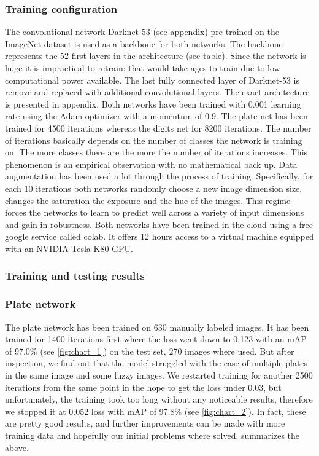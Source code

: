 \subsubsection{Training configuration}
The convolutional network Darknet-53 (see appendix) pre-trained on the ImageNet dataset is used as a backbone for both networks. The backbone
represents the 52 first layers in the architecture (see table). Since the network is huge it is impractical to retrain; that would take ages to train due to low computational power available. The last fully connected layer of Darknet-53 is remove and replaced with additional convolutional layers. The exact architecture is presented in appendix.
Both networks have been trained with 0.001 learning rate using the Adam optimizer with a momentum of 0.9. The plate net has been trained for
4500 iterations whereas the digits net for 8200 iterations. The number of iterations basically depends on the number of classes the network
is training on. The more classes there are the more the number of iterations increases. This phenomenon is an empirical observation with no
mathematical back up. Data augmentation has been used a lot through the process of training. Specifically, for each 10 iterations both networks randomly choose a new image dimension size, changes the saturation the exposure and the hue of the images. This regime forces the networks to learn to predict well across a variety of input dimensions and gain in robustness. Both networks have been trained in the cloud using a free google service called colab. It offers 12 hours access to a virtual machine equipped with an NVIDIA Tesla K80 GPU.

\subsubsection{Training and testing results}
\subsubsection{Plate network}
The plate network has been trained on 630 manually labeled images. It has been trained for 1400 iterations first where the loss went down to
0.123 with an mAP of 97.0\% (see \cref{fig:chart_1}) on the test set, 270 images where used. But after inspection, we find out that the model struggled with the case of multiple plates in the same image and some fuzzy images. We restarted training for another 2500 iterations from the same point in the hope to get the loss under 0.03, but unfortunately, the training took too long without any noticeable results, therefore we stopped it at 0.052 loss with mAP of 97.8\% (see \cref{fig:chart_2}). In fact, these are pretty good results, and further improvements can be made with more training data and hopefully our initial problems where solved.  summarizes the above.

